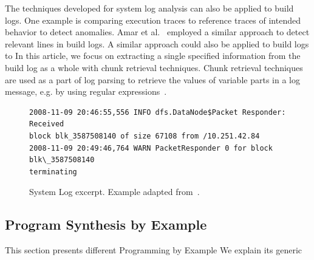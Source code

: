 The techniques developed for system log analysis can also be applied
to build logs.
One example is comparing execution traces to reference
traces of intended behavior to detect anomalies.
Amar et
al.~\cite{amar2019mining} employed a similar approach to detect
relevant lines in build logs.
A similar approach could also be applied to build logs to
In this article, we focus on extracting a single specified information
from the build log as a whole with chunk retrieval techniques.
Chunk
retrieval techniques are used as a part of log parsing to retrieve the
values of variable parts in a log message, e.g.
by using regular
expressions~\cite{nagappan2010abstracting,xu2009detecting}.

\begin{figure}[!t]
  \centering
  \begin{lstlisting}[breaklines=true]
2008-11-09 20:46:55,556 INFO dfs.DataNode$Packet Responder: Received
block blk_3587508140 of size 67108 from /10.251.42.84
2008-11-09 20:49:46,764 WARN PacketResponder 0 for block blk\_3587508140
terminating
  \end{lstlisting}
  \caption{System Log excerpt.
Example adapted from~\cite{he2017towards}.}
  \label{lst:system-log}
\end{figure}

\subsection{Program Synthesis by Example}
\label{sec:rw-prose}
This section presents different Programming by Example
We explain its generic

